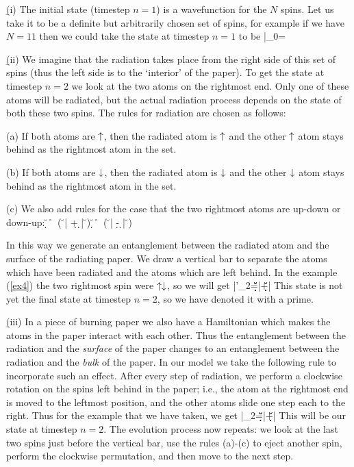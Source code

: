 \documentclass[12pt]{article}
\begin{document}
\b

(i) The initial state (timestep $n=1$) is a wavefunction for the $N$ spins. Let us take it to be a definite but arbitrarily chosen set of spins, for example if we have $N=11$ then we could take the state at timestep $n=1$ to be
\be
|\Psi\rangle_0=\d\u\d\u\u\d\d\u\d\u\d
\label{ex4}
\ee


\b

(ii) We imagine that the radiation takes place from the right side of this set of spins (thus the left side is to the `interior' of the paper). To get the state at timestep $n=2$ we look at the two atoms on the rightmost end. Only one of these atoms will be radiated, but the actual radiation process depends on the state of both these two spins. The rules for radiation are chosen as follows:


(a) If both atoms are $\uparrow$, then the radiated atom is $\uparrow$ and the other $\uparrow$ atom stays behind as the rightmost atom in the set.

(b) If both atoms are $\downarrow$, then the radiated atom is $\downarrow$ and the other $\downarrow$ atom stays behind as the rightmost atom in the set.

(c) We also add rules for the case that the two rightmost atoms are up-down or down-up:
\be
\u\d~\r~\sqi \Big ( \u \Big | \d + \d \Big | \u\Big )
\ee
\be
\d\u~\r~\sqi \Big ( \u \Big | \d - \d \Big | \u\Big )
\ee


In this way we generate an entanglement between the radiated atom and the surface of the radiating paper. We draw a vertical bar to separate the atoms which have been radiated and the atoms which are left behind. In the example (\ref{ex4}) the two rightmost spin were $\uparrow\downarrow$, so we will get 
\be
|\Psi'\rangle_2=\sq \d\u\d\u\u\d\d\u\d\u\Big |\d+\sq \d\u\d\u\u\d\d\u\d\d\Big |\u
\label{ex4p}
\ee
This state is not yet the final state at timestep $n=2$, so we have denoted it with a prime.

\b

(iii) In a piece of burning paper we also have a Hamiltonian which makes the atoms in the paper interact with each other.  Thus the entanglement between the radiation and the {\it surface} of the paper changes  to an entanglement between the radiation and the {\it bulk} of the paper. In our model we take the following rule to incorporate such an effect. After every step of radiation, we perform a clockwise rotation on the spins left behind in the paper; i.e., the atom at the rightmost end is moved to the leftmost position, and the other atoms slide one step each to the right. Thus for the example that we have taken, we get
\be
|\Psi\rangle_2=\sq \u\d\u\d\u\u\d\d\u\d\Big |\d+\sq \d\d\u\d\u\u\d\d\u\d\Big |\u
\label{ex4pp}
\ee
This will be our state at timestep $n=2$. The evolution process now repeats: we look  at the last two spins just before the vertical bar, use the rules (a)-(c) to eject another spin, perform the clockwise permutation, and then move to the next step.
\end{document}
